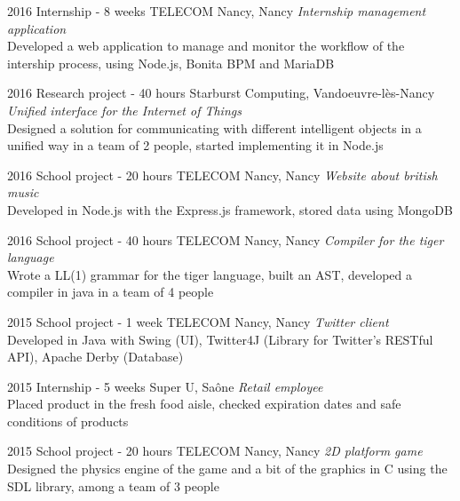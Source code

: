 \documentclass[]{lemaki-cv}
\begin{document}
		\begin{entrylist}


			\entry
			{2016}
			{Internship {\normalfont - 8 weeks}}
			{TELECOM Nancy, Nancy}
			{\emph{Internship management application} \\
			Developed a web application to manage and monitor the workflow of
			the intership process, using Node.js, Bonita BPM and MariaDB}


			\entry
			{2016}
			{Research project {\normalfont - 40 hours}}
			{Starburst Computing, Vandoeuvre-lès-Nancy}
			{\emph{Unified interface for the Internet of Things} \\
			Designed a solution for communicating with different intelligent
			objects in a unified way in a team of 2 people, started implementing
			it in Node.js}


			\entry
			{2016}
			{School project {\normalfont - 20 hours}}
			{TELECOM Nancy, Nancy}
			{\emph{Website about british music} \\
			Developed in Node.js with the Express.js framework, stored data
			using MongoDB}


			\entry
			{2016}
			{School project {\normalfont - 40 hours}}
			{TELECOM Nancy, Nancy}
			{\emph{Compiler for the tiger language} \\
			Wrote a LL(1) grammar for the tiger language, built an AST,
			developed a compiler in java in a team of 4 people}


			\entry
			{2015}
			{School project {\normalfont - 1 week}}
			{TELECOM Nancy, Nancy}
			{\emph{Twitter client} \\
			Developed in Java with Swing (UI), Twitter4J (Library for Twitter's
			RESTful API), Apache Derby (Database)}


			\entry
			{2015}
			{Internship {\normalfont - 5 weeks}}
			{Super U, Saône}
			{\emph{Retail employee} \\
			Placed product in the fresh food aisle, checked expiration dates and
			safe conditions of products}


			\entry
			{2015}
			{School project {\normalfont - 20 hours}}
			{TELECOM Nancy, Nancy}
			{\emph{2D platform game} \\
			Designed the physics engine of the game and a bit of the graphics in
			C using the SDL library, among a team of 3 people}


		\end{entrylist}
	
\end{document}
